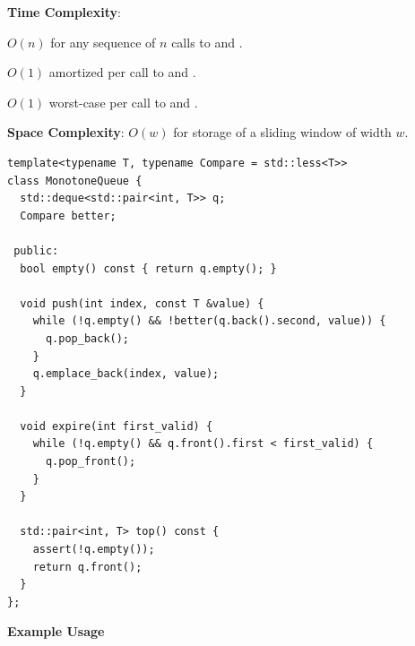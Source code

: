 \textbf{Time Complexity}:
\begin{compactitem}
  \item $O(n)$ for any sequence of $n$ calls to  and .
  \item $O(1)$ amortized per call to  and .
  \item $O(1)$ worst-case per call to  and .
\end{compactitem}

\textbf{Space Complexity}: $O(w)$ for storage of a sliding window of width $w$.

\begin{lstlisting}[style=cpp]
template<typename T, typename Compare = std::less<T>>
class MonotoneQueue {
  std::deque<std::pair<int, T>> q;
  Compare better;

 public:
  bool empty() const { return q.empty(); }

  void push(int index, const T &value) {
    while (!q.empty() && !better(q.back().second, value)) {
      q.pop_back();
    }
    q.emplace_back(index, value);
  }

  void expire(int first_valid) {
    while (!q.empty() && q.front().first < first_valid) {
      q.pop_front();
    }
  }

  std::pair<int, T> top() const {
    assert(!q.empty());
    return q.front();
  }
};
\end{lstlisting}
\textbf{Example Usage}\par
